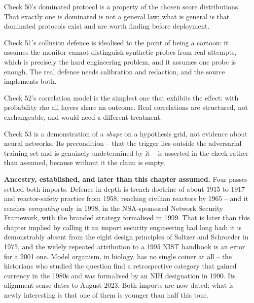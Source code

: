 Check 50's dominated protocol is a property of the chosen score distributions. That exactly one is dominated is not a general law; what is general is that dominated protocols exist and are worth finding before deployment.

Check 51's collusion defence is idealised to the point of being a cartoon: it assumes the monitor cannot distinguish synthetic probes from real attempts, which is precisely the hard engineering problem, and it assumes one probe is enough. The real defence needs calibration and redaction, and the source implements both.

Check 52's correlation model is the simplest one that exhibits the effect: with probability rho all layers share an outcome. Real correlations are structured, not exchangeable, and would need a different treatment.

Check 53 is a demonstration of a \emph{shape} on a hypothesis grid, not evidence about neural networks. Its precondition -- that the trigger lies outside the adversarial training set and is genuinely undetermined by it -- is asserted in the check rather than assumed, because without it the claim is empty.

\textbf{Ancestry, established, and later than this chapter assumed.} Four passes settled both imports. Defence in depth is trench doctrine of about 1915 to 1917 and reactor-safety practice from 1958, reaching civilian reactors by 1965 -- and it reaches \emph{computing} only in 1998, in the NSA-sponsored Network Security Framework, with the branded strategy formalised in 1999. That is later than this chapter implied by calling it an import security engineering had long had: it is demonstrably absent from the eight design principles of Saltzer and Schroeder in 1975, and the widely repeated attribution to a 1995 NIST handbook is an error for a 2001 one. Model organism, in biology, has no single coiner at all -- the historians who studied the question find a retrospective category that gained currency in the 1980s and was formalised by an NIH designation in 1990. Its alignment sense dates to August 2023. Both imports are now dated; what is newly interesting is that one of them is younger than half this tour.

